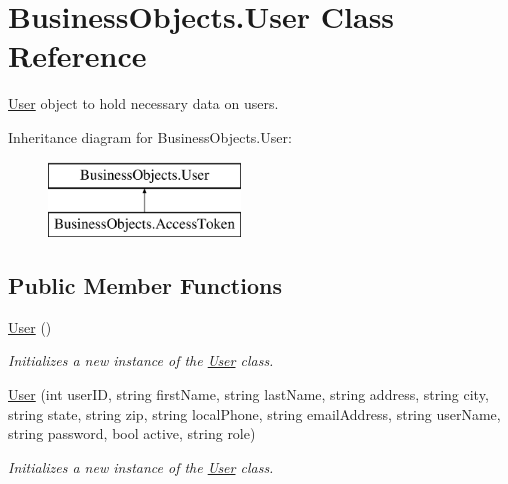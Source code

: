 \hypertarget{class_business_objects_1_1_user}{}\section{Business\+Objects.\+User Class Reference}
\label{class_business_objects_1_1_user}


\hyperlink{class_business_objects_1_1_user}{User} object to hold necessary data on users.  


Inheritance diagram for Business\+Objects.\+User\+:\begin{figure}[H]
\begin{center}
\leavevmode
\includegraphics[height=2.000000cm]{class_business_objects_1_1_user}
\end{center}
\end{figure}
\subsection*{Public Member Functions}
\begin{DoxyCompactItemize}
\item 
\hyperlink{class_business_objects_1_1_user_a8fa01831c4b8e4e9d0a9fb6e93b5e2f9}{User} ()
\begin{DoxyCompactList}\small\item\em Initializes a new instance of the \hyperlink{class_business_objects_1_1_user}{User} class. \end{DoxyCompactList}\item 
\hyperlink{class_business_objects_1_1_user_a6a7967d96c26864fb41b03069500eb46}{User} (int user\+ID, string first\+Name, string last\+Name, string address, string city, string state, string zip, string local\+Phone, string email\+Address, string user\+Name, string password, bool active, string role)
\begin{DoxyCompactList}\small\item\em Initializes a new instance of the \hyperlink{class_business_objects_1_1_user}{User} class. \end{DoxyCompactList}\end{DoxyCompactItemize}
